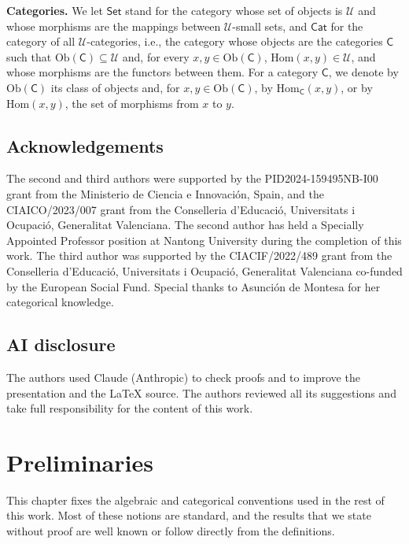 \documentclass[a4paper, reqno]{amsbook}
\theoremstyle{plain}
\theoremstyle{definition}
\begin{document}
\textbf{Categories.} We let $\mathsf{Set}$ stand for the category whose set of objects is $\boldsymbol{\mathcal{U}}$ and whose morphisms are the mappings between $\boldsymbol{\mathcal{U}}$-small sets, and $\mathsf{Cat}$ for the category of all $\boldsymbol{\mathcal{U}}$-categories, i.e., the category whose objects are the categories $\mathsf{C}$ such that $\mathrm{Ob}(\mathsf{C})\subseteq\boldsymbol{\mathcal{U}}$ and, for every $x,y\in\mathrm{Ob}(\mathsf{C})$, $\mathrm{Hom}(x,y)\in\boldsymbol{\mathcal{U}}$, and whose morphisms are the functors between them.
For a category $\mathsf{C}$, we denote by $\mathrm{Ob}(\mathsf{C})$ its class of objects and, for $x,y\in\mathrm{Ob}(\mathsf{C})$, by $\mathrm{Hom}_{\mathsf{C}}(x,y)$, or by $\mathrm{Hom}(x,y)$, the set of morphisms from $x$ to $y$.

\section{Acknowledgements}
The second and third authors were supported by the PID2024-159495NB-I00 grant from the
Ministerio de Ciencia e Innovaci\'{o}n, Spain, and the CIAICO/2023/007 grant from the
Conselleria d'Educaci\'{o}, Universitats i Ocupaci\'{o}, Generalitat Valenciana.
The second author has held a Specially Appointed Professor position at Nantong University during the completion of this work.
The third author was supported by the CIACIF/2022/489 grant from the Conselleria d'Educaci\'{o}, Universitats i Ocupaci\'{o}, Generalitat Valenciana co-funded by the European Social Fund.
Special thanks to Asunci\'{o}n de Montesa for her categorical knowledge.

\section{AI disclosure}
The authors used Claude (Anthropic) to check proofs and to improve the presentation and the \LaTeX{} source.
The authors reviewed all its suggestions and take full responsibility for the content of this work.

\chapter{Preliminaries}\label{SPreliminaries}

This chapter fixes the algebraic and categorical conventions used in the rest of this work.
Most of these notions are standard, and the results that we state without proof are well known or follow directly from the definitions.
\end{document}
